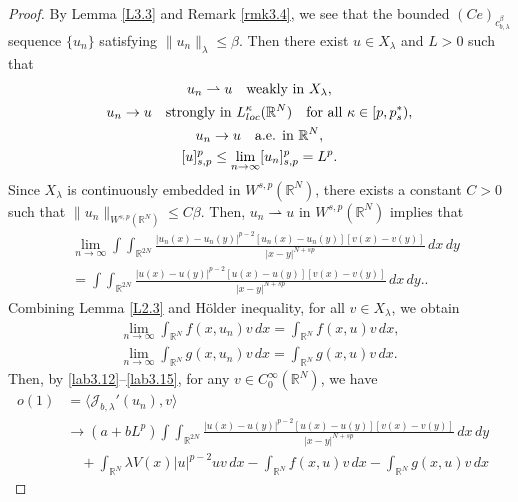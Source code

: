 \documentclass[10pt,a4paper]{amsart}
\numberwithin{equation}{section}
\begin{document}
\begin{proof}
By Lemma \ref{L3.3} and Remark \ref{rmk3.4}, we see that the bounded 
$(Ce)_{c_{b,\lambda}^\beta}$ sequence $\{u_n\}$ satisfying $\|u_n\|_\lambda\leq \beta$. 
Then there exist $u\in X_\lambda$ and $L>0$ such that
\begin{equation}\label{lab3.12}
\begin{gathered}
u_n\rightharpoonup u \quad \text{weakly in } X_\lambda, \\
u_n\to  u  \quad \text{strongly in } L^\kappa_{\rm loc}(\mathbb{R}^N) \quad
\text{for all } \kappa\in[p,p_s^*), \\
u_n\to  u  \quad \text{a.e. in } \mathbb{R}^N, \\
[u]^p_{s,p}\leq \lim_{n\to \infty}[u_n]^p_{s,p}=L^p.
\end{gathered}
\end{equation}
Since $X_\lambda$ is continuously embedded in $W^{s,p}(\mathbb{R}^N)$, 
there exists a constant $C>0$ such that $\|u_n\|_{W^{s,p}(\mathbb{R}^N)}\leq C\beta$. 
Then, $u_n\rightharpoonup u$ in $W^{s,p}(\mathbb{R}^N)$ implies that
\begin{equation}\label{lab3.13}
\begin{split}
&\lim_{n\to \infty}\int\int_{\mathbb{R}^{2N}}
 \frac{|u_n(x)-u_n(y)|^{p-2}[u_n(x)-u_n(y)][v(x)-v(y)]}{|x-y|^{N+sp}}\,dx\,dy\\
&=\int\int_{\mathbb{R}^{2N}}
 \frac{|u(x)-u(y)|^{p-2}[u(x)-u(y)][v(x)-v(y)]}{|x-y|^{N+sp}}\,dx\,dy..
\end{split}
\end{equation}
Combining Lemma \ref{L2.3} and H\"older inequality, for all $v\in X_\lambda$, 
we obtain
\begin{gather}\label{lab3.14}
\lim_{n\to \infty}\int_{\mathbb{R}^N}f(x, u_n)v\,dx=\int_{\mathbb{R}^N}f(x, u)v\,dx,\\
\label{lab3.15}
\lim_{n\to \infty}\int_{\mathbb{R}^N}g(x, u_n)v\,dx=\int_{\mathbb{R}^N}g(x, u)v\,dx.
\end{gather}
Then, by \eqref{lab3.12}--\eqref{lab3.15}, for any $v\in C^\infty_0(\mathbb{R}^N)$, 
we have
\begin{align*}
o(1)&= \langle \mathcal{J}_{b,\lambda}'(u_n), v \rangle  \\
&\to  (a+bL^p)\int\int_{\mathbb{R}^{2N}}\frac{|u(x)-u(y)|^{p-2}[u(x)-u(y)]
 [v(x)-v(y)]}{|x-y|^{N+sp}}\,dx\,dy  \\
&\quad +\int_{\mathbb{R}^N}\lambda V(x)|u|^{p-2}uv\,dx 
 -\int_{\mathbb{R}^N}f(x,u)v\,dx-\int_{\mathbb{R}^N}g(x,u)v\,dx \quad

\end{align*}
\end{proof}
\end{document}
